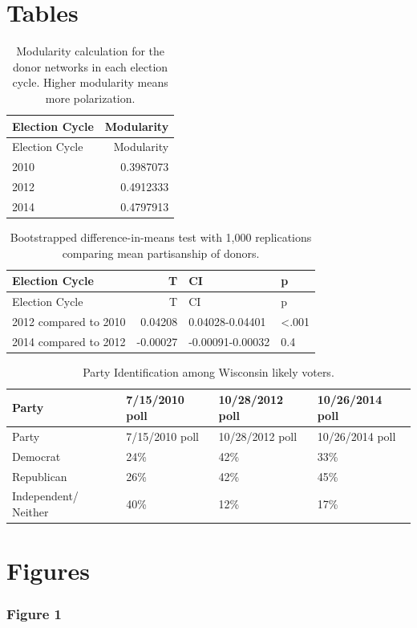\documentclass[12pt,]{article}
\begin{document}
\newpage

\hypertarget{tables}{%
\section{Tables}\label{tables}}

\begin{longtable}[]{@{}lr@{}}
\caption{Modularity calculation for the donor networks in each election
cycle. Higher modularity means more polarization.}\tabularnewline
\toprule
Election Cycle & Modularity\tabularnewline
\midrule
\endfirsthead
\toprule
Election Cycle & Modularity\tabularnewline
\midrule
\endhead
2010 & 0.3987073\tabularnewline
2012 & 0.4912333\tabularnewline
2014 & 0.4797913\tabularnewline
\bottomrule
\end{longtable}

\newpage

\begin{longtable}[]{@{}lrll@{}}
\caption{Bootstrapped difference-in-means test with 1,000 replications
comparing mean partisanship of donors.}\tabularnewline
\toprule
Election Cycle & T & CI & p\tabularnewline
\midrule
\endfirsthead
\toprule
Election Cycle & T & CI & p\tabularnewline
\midrule
\endhead
2012 compared to 2010 & 0.04208 & 0.04028-0.04401 &
\textless.001\tabularnewline
2014 compared to 2012 & -0.00027 & -0.00091-0.00032 & 0.4\tabularnewline
\bottomrule
\end{longtable}

\newpage

\begin{longtable}[]{@{}llll@{}}
\caption{Party Identification among Wisconsin likely
voters.}\tabularnewline
\toprule
Party & 7/15/2010 poll & 10/28/2012 poll & 10/26/2014
poll\tabularnewline
\midrule
\endfirsthead
\toprule
Party & 7/15/2010 poll & 10/28/2012 poll & 10/26/2014
poll\tabularnewline
\midrule
\endhead
Democrat & 24\% & 42\% & 33\%\tabularnewline
Republican & 26\% & 42\% & 45\%\tabularnewline
Independent/ Neither & 40\% & 12\% & 17\%\tabularnewline
\bottomrule
\end{longtable}

\newpage

\hypertarget{figures}{%
\section{Figures}\label{figures}}

\hypertarget{figure-1}{%
\subsubsection{Figure 1}\label{figure-1}}
\end{document}
